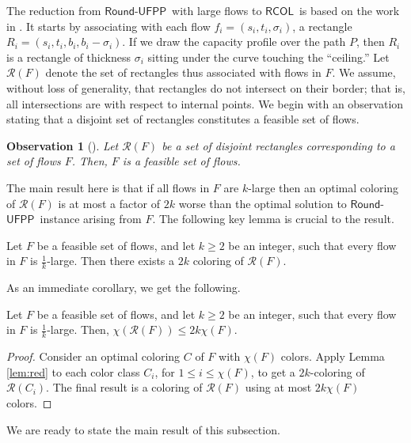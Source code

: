 \documentclass[a4paper,UKenglish]{lipics-v2016}
\newcommand{\rufpp}{\mbox{$\mathsf{Round}$-$\mathsf{UFPP}$}}
\newcommand{\rcol}{\mbox{$\mathsf{RCOL}$}}
\theoremstyle{plain}
\newtheorem{observation}[theorem]{Observation}
\newcommand{\cR}{\mathcal{R}}
\begin{document}
The reduction from \rufpp\ with large flows to \rcol\ is based on the work in \cite{bonsama}. It starts by associating with each flow $f_i=(s_i,t_i,\sigma_i)$, a rectangle $R_i=(s_i,t_i,b_i,b_i-\sigma_i)$. If we draw the capacity profile over the path $P$, then $R_i$ is a rectangle of thickness $\sigma_i$ sitting under the curve touching the ``ceiling.'' Let $\cR(F)$ denote the set of rectangles thus associated with flows in $F$. We assume, without loss of generality, that rectangles do not intersect on their border; that is, all intersections are with respect to internal points. We begin with an observation stating that a disjoint set of rectangles constitutes a feasible set of flows.

\begin{observation}[\cite{bonsama}]\label{obser: coloring of RCOL is feasible for RUFP}
Let $\cR(F)$ be a set of disjoint rectangles corresponding to a set of flows $F$. Then, $F$ is a feasible set of flows.
\end{observation}

The main result here is that if all flows in $F$ are $k$-large then an optimal coloring of $\mathcal{R}(F)$ is at most a factor of $2k$ worse than the optimal solution to \rufpp\ instance arising from $F$. The following key lemma is crucial to the result.

\begin{lemma}\label{lem:red}
Let $F$ be a feasible set of flows, and let $k\geq 2$ be an integer, such that every flow in $F$ is $\frac{1}{k}$-large. Then there exists a $2k$ coloring of $\cR(F)$.
\end{lemma}


As an immediate corollary, we get the following.

\begin{corollary}\label{cor:red}
Let $F$ be a feasible set of flows, and let $k\geq 2$ be an integer, such that every flow in $F$ is $\frac{1}{k}$-large. Then, $\chi(\cR(F)) \leq 2k\chi(F)$.
\end{corollary}
\begin{proof}
Consider an optimal coloring $C$ of $F$ with $\chi(F)$ colors. Apply Lemma \ref{lem:red} to each color class $C_i$, for $1\leq i\leq \chi(F)$, to get a $2k$-coloring of $\cR(C_i)$. The final result is a coloring of $\cR(F)$ using at most $2k\chi(F)$ colors.
\end{proof}

We are ready to state the main result of this subsection.
\end{document}
